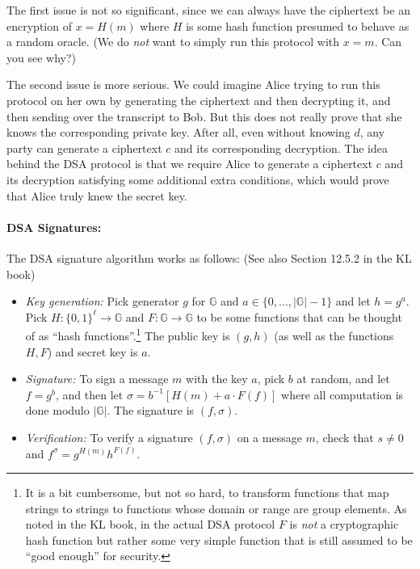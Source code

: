 The first issue is not so significant, since we can always have the
ciphertext be an encryption of \(x=H(m)\) where \(H\) is some hash
function presumed to behave as a random oracle. (We do \emph{not} want
to simply run this protocol with \(x=m\). Can you see why?)

The second issue is more serious. We could imagine Alice trying to run
this protocol on her own by generating the ciphertext and then
decrypting it, and then sending over the transcript to Bob. But this
does not really prove that she knows the corresponding private key.
After all, even without knowing \(d\), any party can generate a
ciphertext \(c\) and its corresponding decryption. The idea behind the
DSA protocol is that we require Alice to generate a ciphertext \(c\) and
its decryption satisfying some additional extra conditions, which would
prove that Alice truly knew the secret key.

\paragraph{DSA Signatures:} The DSA signature algorithm works as
follows: (See also Section 12.5.2 in the KL book)

\begin{itemize}
\tightlist
\item
  \emph{Key generation:} Pick generator \(g\) for \(\mathbb{G}\) and
  \(a\in \{0,\ldots,|\mathbb{G}|-1\}\) and let \(h=g^a\). Pick
  \(H:\{0,1\}^\ell\rightarrow\mathbb{G}\) and
  \(F:\mathbb{G}\rightarrow\mathbb{G}\) to be some functions that can be
  thought of as ``hash functions''.\footnote{It is a bit cumbersome, but
    not so hard, to transform functions that map strings to strings to
    functions whose domain or range are group elements. As noted in the
    KL book, in the actual DSA protocol \(F\) is \emph{not} a
    cryptographic hash function but rather some very simple function
    that is still assumed to be ``good enough'' for security.} The
  public key is \((g,h)\) (as well as the functions \(H,F\)) and secret
  key is \(a\).\\
\item
  \emph{Signature:} To sign a message \(m\) with the key \(a\), pick
  \(b\) at random, and let \(f=g^b\), and then let
  \(\sigma = b^{-1}[H(m)+a\cdot F(f)]\) where all computation is done
  modulo \(|\mathbb{G}|\). The signature is \((f,\sigma)\).\\
\item
  \emph{Verification:} To verify a signature \((f,\sigma)\) on a message
  \(m\), check that \(s\neq 0\) and \(f^\sigma=g^{H(m)}h^{F(f)}\).
\end{itemize}

